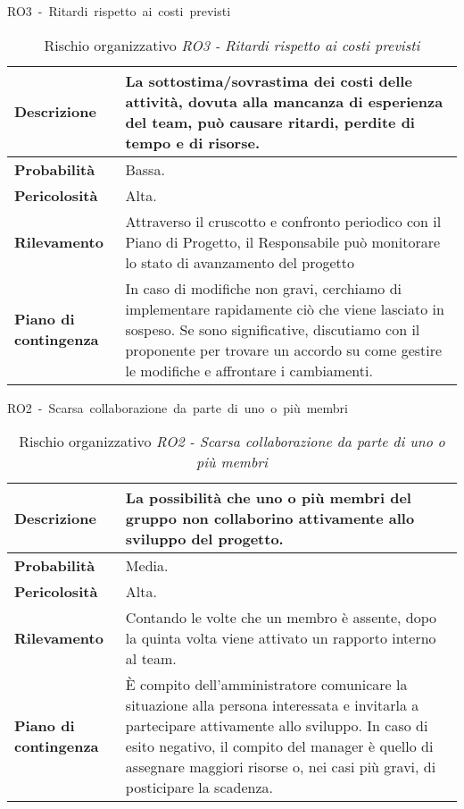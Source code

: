 \begin{table}[!h]
    \centering
    \hbox{RO3 - Ritardi rispetto ai costi previsti}
    \vspace{0.3cm}
	\begin{tabular}{|l|p{10cm}|} 
		\hline
		\textbf{Descrizione} & La sottostima/sovrastima dei costi delle attività, dovuta alla mancanza di esperienza del team, può causare ritardi, perdite di tempo e di risorse. \\ 
        \hline
        \textbf{Probabilità} & Bassa. \\
        \hline
        \textbf{Pericolosità} & Alta. \\
        \hline
        \textbf{Rilevamento} & Attraverso il cruscotto e confronto periodico con il Piano di Progetto, il Responsabile può monitorare lo stato di avanzamento del progetto \\
        \hline
        \textbf{Piano di contingenza} & In caso di modifiche non gravi, cerchiamo di implementare rapidamente ciò che viene lasciato in sospeso. Se sono significative, discutiamo con il proponente per trovare un accordo su come gestire le modifiche e affrontare i cambiamenti.\\
		\hline
	\end{tabular}
    \caption{Rischio organizzativo \textit{RO3 - Ritardi rispetto ai costi previsti}}
    \label{table:3}
\end{table}
\begin{table}[!h]
    \centering
    \hbox{RO2 - Scarsa collaborazione da parte di uno o più membri}
    \vspace{0.3cm}
	\begin{tabular}{|l|p{10cm}|} 
		\hline
		\textbf{Descrizione} & La possibilità che uno o più membri del gruppo non collaborino attivamente allo sviluppo del progetto. \\ 
        \hline
        \textbf{Probabilità} & Media. \\
        \hline
        \textbf{Pericolosità} & Alta. \\
        \hline
        \textbf{Rilevamento} & Contando le volte che un membro è assente, dopo la quinta volta viene attivato un rapporto interno al team.\\
        \hline
        \textbf{Piano di contingenza} & È compito dell'amministratore comunicare la situazione alla persona interessata e invitarla a partecipare attivamente allo sviluppo. In caso di esito negativo, il compito del manager è quello di assegnare maggiori risorse o, nei casi più gravi, di posticipare la scadenza.\\
		\hline
	\end{tabular}
    \caption{Rischio organizzativo \textit{RO2 - Scarsa collaborazione da parte di uno o più membri}}
    \label{table:4}
\end{table}

